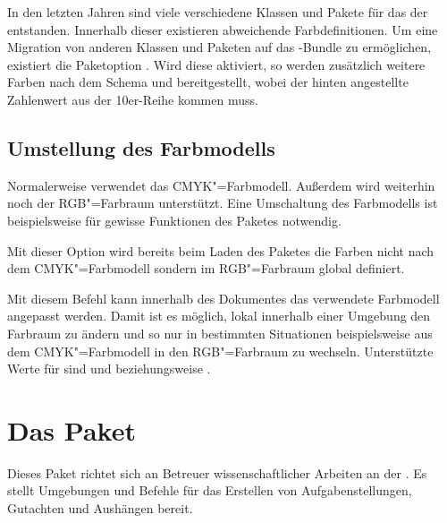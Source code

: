 \documentclass[%
  english,ngerman,%
  headings=optiontoheadandtoc,captions=tableheading,numbers=noenddot,%
  chapterpage,cdfoot,%
]{tudscrman}
\begin{document}
\begin{Declaration}{}
\printdeclarationlist%
In den letzten Jahren sind viele verschiedene Klassen und Pakete für das \CD der 
\TnUD entstanden. Innerhalb dieser existieren abweichende Farbdefinitionen. Um 
eine Migration von anderen Klassen und Paketen auf das \TUDScript-Bundle zu 
ermöglichen, existiert die Paketoption . Wird diese aktiviert, so 
werden zusätzlich weitere Farben nach dem Schema  und 
 bereitgestellt, wobei der hinten angestellte 
Zahlenwert aus der 10er-Reihe kommen muss.
\end{Declaration}


\subsection{Umstellung des Farbmodells}
%
Normalerweise verwendet  das CMYK"=Farbmodell. Außerdem 
wird weiterhin noch der RGB"=Farbraum unterstützt. Eine Umschaltung des 
Farbmodells ist beispielsweise für gewisse Funktionen des Paketes  
notwendig.

\begin{Declaration}{}
\printdeclarationlist%
Mit dieser Option wird bereits beim Laden des Paketes  die 
Farben nicht nach dem CMYK"=Farbmodell sondern im RGB"=Farbraum global definiert.
\end{Declaration}


\begin{Declaration}{}
\printdeclarationlist%
%
Mit diesem Befehl kann innerhalb des Dokumentes das verwendete Farbmodell 
angepasst werden. Damit ist es möglich, lokal innerhalb einer Umgebung den 
Farbraum zu ändern und so nur in bestimmten Situationen beispielsweise aus dem 
CMYK"=Farbmodell in den RGB"=Farbraum zu wechseln. Unterstützte Werte für 
 sind  und  beziehungsweise 
.
\end{Declaration}


\section{Das Paket }
Dieses Paket richtet sich an Betreuer wissenschaftlicher Arbeiten an der \TnUD. 
Es stellt Umgebungen und Befehle für das Erstellen von Aufgabenstellungen, 
Gutachten und Aushängen bereit.
\end{document}
